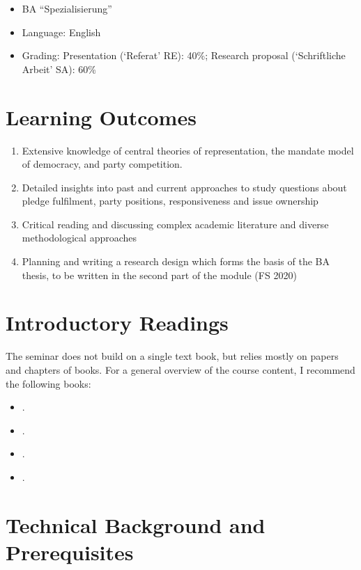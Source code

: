 \documentclass[abstract=on,parskip=full,headings=standardclasses,fontsize=11pt,paper=a4]{scrartcl}
\begin{document}
\begin{itemize}
\item BA ``Spezialisierung''
\item  Language: English
\item Grading: Presentation (`Referat' RE): 40\%;  Research proposal (`Schriftliche Arbeit' SA): 60\%
\end{itemize}

\section*{Learning Outcomes}

\begin{enumerate}
\item Extensive knowledge of central theories of representation, the mandate model of democracy, and party competition. 
\item Detailed insights into past and current approaches to study questions about pledge fulfilment, party positions, responsiveness and issue ownership 
\item Critical reading and discussing  complex academic literature and diverse methodological approaches
\item Planning and writing a research design which forms the basis of the  BA thesis, to be written in the second part of the module (FS 2020)
\end{enumerate}

\section*{Introductory Readings}

The seminar does not build on a single text book, but relies mostly on papers and chapters of books. For  a general overview of the course content, I recommend the following books:

\begin{itemize}
\item {}.
\item {}.
\item {}.
\item {}.
\end{itemize}


\section*{Technical Background and Prerequisites}
\end{document}
